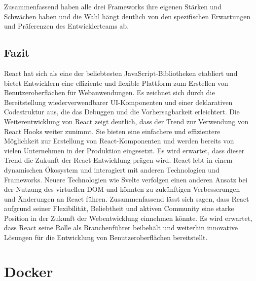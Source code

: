 Zusammenfassend haben alle drei Frameworks ihre eigenen Stärken und Schwächen haben und die Wahl hängt deutlich von den spezifischen Erwartungen und Präferenzen des Entwicklerteams ab.

\subsection{Fazit}
React hat sich als eine der beliebtesten JavaScript-Bibliotheken etabliert und bietet Entwicklern eine effiziente und flexible Plattform zum Erstellen von Benutzeroberflächen für Webanwendungen. Es zeichnet sich durch die Bereitstellung wiederverwendbarer UI-Komponenten und einer deklarativen Codestruktur aus, die das Debuggen und die Vorhersagbarkeit erleichtert. 
Die Weiterentwicklung von React zeigt deutlich, dass der Trend zur Verwendung von React Hooks weiter zunimmt. Sie bieten eine einfachere und effizientere Möglichkeit zur Erstellung von React-Komponenten  und werden bereits von vielen Unternehmen in der Produktion eingesetzt. Es wird erwartet, dass dieser Trend die Zukunft der React-Entwicklung  prägen wird.  React lebt in einem dynamischen Ökosystem und interagiert mit anderen Technologien und Frameworks. Neuere Technologien wie Svelte verfolgen einen anderen Ansatz bei der Nutzung des virtuellen DOM und könnten zu zukünftigen Verbesserungen und Änderungen an React führen. 
Zusammenfassend lässt sich sagen, dass React aufgrund seiner Flexibilität, Beliebtheit und aktiven Community  eine starke Position in der Zukunft der Webentwicklung einnehmen könnte. Es wird erwartet, dass React seine Rolle als Branchenführer beibehält und weiterhin innovative Lösungen für die Entwicklung von Benutzeroberflächen bereitstellt.

\section{Docker}

\begin{figure}
\centering
{}
\end{figure}

